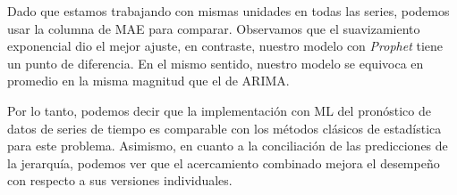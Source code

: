 Dado que estamos trabajando con mismas unidades en todas las series, podemos usar la columna de MAE para comparar. Observamos que el suavizamiento exponencial dio el mejor ajuste, en contraste, nuestro modelo con \textit{Prophet} tiene un punto de diferencia. En el mismo sentido, nuestro modelo se equivoca en promedio en la misma magnitud que el de ARIMA.

Por lo tanto, podemos decir que la implementación con ML del pronóstico de datos de series de tiempo es comparable con los métodos clásicos de estadística para este problema. Asimismo, en cuanto a la conciliación de las predicciones de la jerarquía, podemos ver que el acercamiento combinado mejora el desempeño con respecto a sus versiones individuales.


